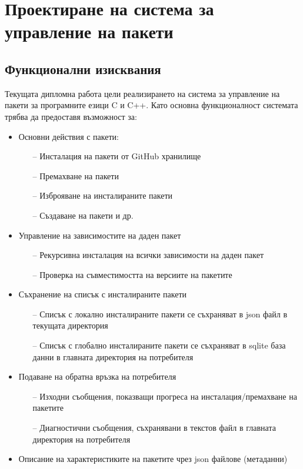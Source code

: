 \graphicspath{ {./chapter2/images/} }

\chapter{Проектиране на система за управление на пакети}


\section{Функционални изисквания}

Текущата дипломна работа цели реализирането на система за управление на пакети
за програмните езици C и C++. Като основна функционалност системата трябва да
предоставя възможност за:

\begin{itemize}
    \item Основни действия с пакети:
    \begin{itemize}
        \item[--] Инсталация на пакети от GitHub хранилище
        \item[--] Премахване на пакети
        \item[--] Изброяване на инсталираните пакети
        \item[--] Създаване на пакети и др.
    \end{itemize}
    \item Управление на зависимостите на даден пакет
    \begin{itemize}
        \item[--] Рекурсивна инсталация на всички зависимости на даден пакет
        \item[--] Проверка на съвместимостта на версиите на пакетите
    \end{itemize}
    \item Съхранение на списък с инсталираните пакети
    \begin{itemize}
        \item[--] Списък с локално инсталираните пакети се съхраняват в
                  \acrshort{json} файл в текущата директория
        \item[--] Списък с глобално инсталираните пакети се съхраняват в sqlite
                  база данни в главната директория на потребителя
    \end{itemize}
    \item Подаване на обратна връзка на потребителя
    \begin{itemize}
        \item[--] Изходни съобщения, показващи прогреса на инсталация/премахване
                  на пакетите
        \item[--] Диагностични съобщения, съхранявани в текстов файл в главната
                  директория на потребителя
    \end{itemize}
    \item Описание на характеристиките на пакетите чрез \acrshort{json} файлове
          (метаданни)
\end{itemize}


